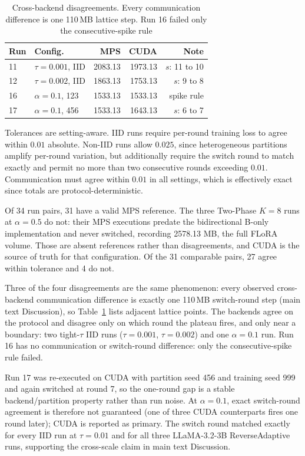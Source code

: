 \documentclass[pdflatex,sn-nature]{sn-jnl}
\begin{document}
\begin{table}[tbp]
\centering
\footnotesize
\scriptsize
\renewcommand{\arraystretch}{0.85}
\setlength{\tabcolsep}{3pt}
\caption{Cross-backend disagreements. Every communication difference is one 110\,MB lattice step. Run 16 failed only the consecutive-spike rule}
\label{tab:d2}
\begin{tabular}{@{}llrrr@{}}
\toprule
Run & Config. & MPS & CUDA & Note \\
\midrule
11 & $\tau{=}0.001$, IID & 2083.13 & 1973.13 & $s$: 11 to 10 \\
12 & $\tau{=}0.002$, IID & 1863.13 & 1753.13 & $s$: 9 to 8 \\
16 & $\alpha{=}0.1$, 123 & 1533.13 & 1533.13 & spike rule \\
17 & $\alpha{=}0.1$, 456 & 1533.13 & 1643.13 & $s$: 6 to 7 \\
\bottomrule
\end{tabular}
\end{table}


Tolerances are setting-aware. IID runs require per-round training loss to agree within $0.01$ absolute. Non-IID runs allow $0.025$, since heterogeneous partitions amplify per-round variation, but additionally require the switch round to match exactly and permit no more than two consecutive rounds exceeding $0.01$. Communication must agree within $0.01$ in all settings, which is effectively exact since totals are protocol-deterministic.

Of 34 run pairs, 31 have a valid MPS reference. The three Two-Phase $K{=}8$ runs at $\alpha{=}0.5$ do not: their MPS executions predate the bidirectional B-only implementation and never switched, recording 2578.13 MB, the full FLoRA volume. Those are absent references rather than disagreements, and CUDA is the source of truth for that configuration. Of the 31 comparable pairs, 27 agree within tolerance and 4 do not.

Three of the four disagreements are the same phenomenon: every observed cross-backend communication difference is exactly one 110\,MB switch-round step (main text Discussion), so Table~\ref{tab:d2} lists adjacent lattice points. The backends agree on the protocol and disagree only on which round the plateau fires, and only near a boundary: two tight-$\tau$ IID runs ($\tau{=}0.001$, $\tau{=}0.002$) and one $\alpha{=}0.1$ run. Run 16 has no communication or switch-round difference: only the consecutive-spike rule failed.

Run 17 was re-executed on CUDA with partition seed 456 and training seed 999 and again switched at round 7, so the one-round gap is a stable backend/partition property rather than run noise. At $\alpha{=}0.1$, exact switch-round agreement is therefore not guaranteed (one of three CUDA counterparts fires one round later); CUDA is reported as primary. The switch round matched exactly for every IID run at $\tau{=}0.01$ and for all three LLaMA-3.2-3B ReverseAdaptive runs, supporting the cross-scale claim in main text Discussion.
\end{document}
